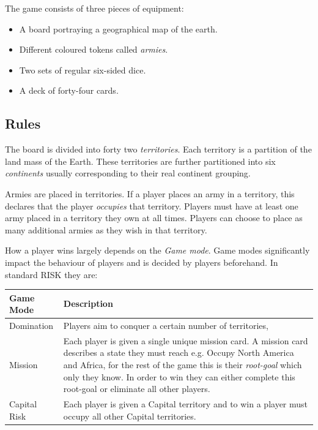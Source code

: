 \documentclass[parskip]{cs4rep}
\begin{document}
The game consists of three pieces of equipment:

\begin{itemize}
\item
A board portraying a geographical map of the earth.
\item
Different coloured tokens called \textit{armies}.
\item
Two sets of regular six-sided dice.
\item
A deck of forty-four cards.
\end{itemize}

\subsection{Rules}

The board is divided into forty two \textit{territories}. Each territory is a partition of the land mass of the Earth. These territories are further partitioned into six \textit{continents} usually corresponding to their real continent grouping.

Armies are placed in territories. If a player places an army in a territory, this declares that the player \textit{occupies} that territory. Players must have at least one army placed in a territory they own at all times. Players can choose to place as many additional armies as they wish in that territory.

How a player wins largely depends on the \textit{Game mode}. Game modes significantly impact the behaviour of players and is decided by players beforehand. In standard RISK they are:
\newline

\begin{tabular}{|l|p{11cm}|}
\hline 
\textbf{Game Mode} & \textbf{Description} \\ 
\hline 
Domination & Players aim to conquer a certain number of territories, \\ 
\hline 
Mission & Each player is given a single unique mission card. A mission card describes a state they must reach e.g. Occupy North America and Africa, for the rest of the game this is their \textit{root-goal} which only they know. In order to win they can either complete this root-goal or eliminate all other players. \\ 
\hline 
Capital Risk & Each player is given a Capital territory and to win a player must occupy all other Capital territories. \\ 
\hline
\end{tabular} 
\end{document}

